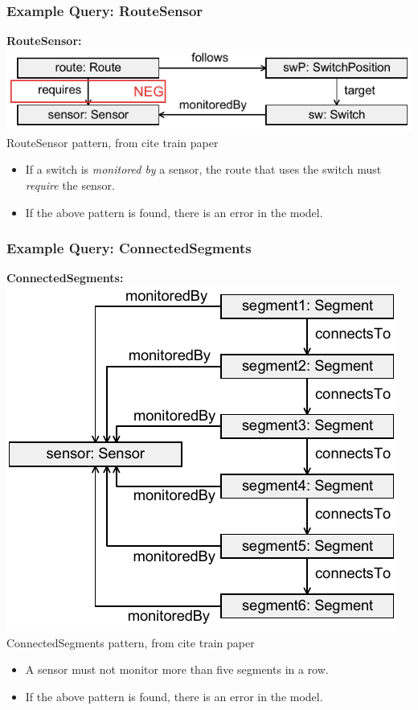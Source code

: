 \documentclass[aspectratio=169,9pt,english]{beamer}
\newcommand{\todotext}[1]{{\ttfamily\color{red}#1}}
\begin{document}
\begin{frame}
	\frametitle{Example  Query: RouteSensor}
	\textbf{RouteSensor:}\\
	\includegraphics[width=.5\linewidth]{images/route_sensor_query.png}\\
	\footnotesize{RouteSensor pattern, from \todotext{cite train paper}}\normalsize
	
	\vspace{1\baselineskip}
	\begin{itemize}
		\item If a switch is \emph{monitored by} a sensor, the route that uses the switch must \emph{require} the sensor.
		\item If the above pattern is found, there is an error in the model.
	\end{itemize}
\end{frame}

\begin{frame}
	\frametitle{Example  Query: ConnectedSegments}
	\textbf{ConnectedSegments:}\\
	\includegraphics[width=.38\linewidth]{images/connected_segments_query.png}\\
	\footnotesize{ConnectedSegments pattern, from \todotext{cite train paper}}\normalsize
	
	\begin{itemize}
		\item A sensor must not monitor more than five segments in a row.
		\item If the above pattern is found, there is an error in the model.
	\end{itemize}
\end{frame}
\end{document}
